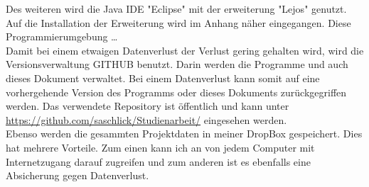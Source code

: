 Des weiteren wird die Java IDE "Eclipse" mit der erweiterung "Lejos" genutzt. Auf die Installation der Erweiterung wird im Anhang näher eingegangen. Diese Programmierumgebung \dots \\

Damit bei einem etwaigen Datenverlust der Verlust gering gehalten wird, wird die Versionsverwaltung GITHUB benutzt. Darin werden die Programme und auch dieses Dokument verwaltet. Bei einem Datenverlust kann somit auf eine vorhergehende  Version des Programms oder dieses Dokuments zurückgegriffen werden. Das verwendete Repository ist öffentlich und kann unter \url{https://github.com/saschlick/Studienarbeit/} eingesehen werden.\\Ebenso werden die gesammten Projektdaten in meiner DropBox gespeichert. Dies hat mehrere Vorteile. Zum einen kann ich an von jedem Computer mit Internetzugang darauf zugreifen und zum anderen ist es ebenfalls eine Absicherung gegen Datenverlust.     








